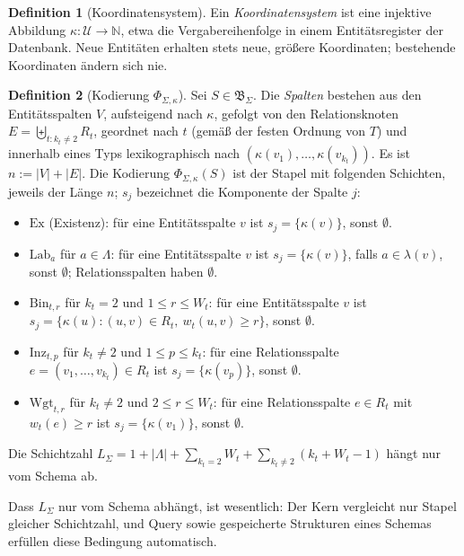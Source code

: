 \documentclass[a4paper,12pt, twoside]{report}
\theoremstyle{definition}
\newtheorem{definition}{Definition}
\begin{document}
\begin{definition}[Koordinatensystem]
	Ein \emph{Koordinatensystem} ist eine injektive Abbildung $\kappa:\mathcal{U}\to\mathbb{N}$, etwa die Vergabereihenfolge in einem Entitätsregister der Datenbank. Neue Entitäten erhalten stets neue, größere Koordinaten; bestehende Koordinaten ändern sich nie.
\end{definition}

\begin{definition}[Kodierung $\Phi_{\Sigma,\kappa}$]
	\label{def:univ_kodierung}
	Sei $S\in\mathfrak{B}_\Sigma$. Die \emph{Spalten} bestehen aus den Entitätsspalten $V$, aufsteigend nach $\kappa$, gefolgt von den Relationsknoten $E=\biguplus_{t:k_t\ne 2}R_t$, geordnet nach $t$ (gemäß der festen Ordnung von $T$) und innerhalb eines Typs lexikographisch nach $(\kappa(v_1),\dots,\kappa(v_{k_t}))$. Es ist $n:=|V|+|E|$. Die Kodierung $\Phi_{\Sigma,\kappa}(S)$ ist der Stapel mit folgenden Schichten, jeweils der Länge $n$; $s_j$ bezeichnet die Komponente der Spalte $j$:
	\begin{itemize}
	\item $\mathrm{Ex}$ (Existenz): für eine Entitätsspalte $v$ ist $s_j=\{\kappa(v)\}$, sonst $\emptyset$.
	\item $\mathrm{Lab}_a$ für $a\in\Lambda$: für eine Entitätsspalte $v$ ist $s_j=\{\kappa(v)\}$, falls $a\in\lambda(v)$, sonst $\emptyset$; Relationsspalten haben $\emptyset$.
	\item $\mathrm{Bin}_{t,r}$ für $k_t=2$ und $1\le r\le W_t$: für eine Entitätsspalte $v$ ist $s_j=\{\kappa(u) : (u,v)\in R_t,\ w_t(u,v)\ge r\}$, sonst $\emptyset$.
	\item $\mathrm{Inz}_{t,p}$ für $k_t\ne2$ und $1\le p\le k_t$: für eine Relationsspalte $e=(v_1,\dots,v_{k_t})\in R_t$ ist $s_j=\{\kappa(v_p)\}$, sonst $\emptyset$.
	\item $\mathrm{Wgt}_{t,r}$ für $k_t\ne2$ und $2\le r\le W_t$: für eine Relationsspalte $e\in R_t$ mit $w_t(e)\ge r$ ist $s_j=\{\kappa(v_1)\}$, sonst $\emptyset$.
	\end{itemize}
	Die Schichtzahl $L_\Sigma=1+|\Lambda|+\sum_{k_t=2}W_t+\sum_{k_t\ne2}(k_t+W_t-1)$ hängt nur vom Schema ab.
\end{definition}

Dass $L_\Sigma$ nur vom Schema abhängt, ist wesentlich: Der Kern vergleicht nur Stapel gleicher Schichtzahl, und Query sowie gespeicherte Strukturen eines Schemas erfüllen diese Bedingung automatisch.
\end{document}
